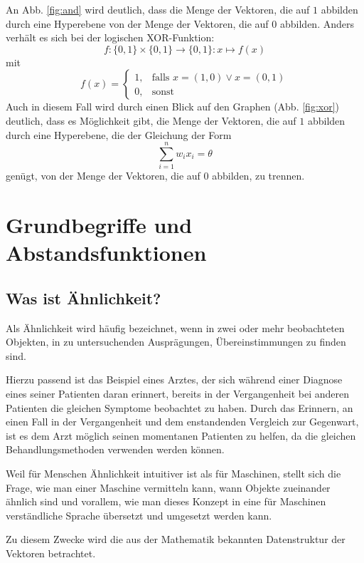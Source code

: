 \documentclass[fontsize=11pt]{scrartcl}
\begin{document}
                    An Abb. \ref{fig:and} wird deutlich, dass die Menge der Vektoren, die auf $1$ abbilden durch eine Hyperebene von der Menge der Vektoren, die auf $0$ abbilden.
                    \newline
                    Anders verhält es sich bei der logischen XOR-Funktion:
                    $$
                        f:\{0,1\}\times\{0,1\}\rightarrow\{0,1\}: x\mapsto f(x)
                    $$
                    mit
                    $$
                        f(x)=\left\{\begin{array}{cl} 1, & \mbox{falls }x=(1,0) \vee x = (0,1)\\
                        0, & \mbox{sonst}\end{array}\right. 
                    $$
                    Auch in diesem Fall wird durch einen Blick auf den Graphen (Abb. \ref{fig:xor}) deutlich, dass es Möglichkeit gibt, die Menge der Vektoren, die auf $1$ abbilden durch eine Hyperebene, die der Gleichung der Form
                    $$
                        \sum_{i=1}^nw_ix_i = \theta
                    $$
                    genügt, von der Menge der Vektoren, die auf $0$ abbilden, zu trennen\cite{ertel2016}.

                        
        \section{Grundbegriffe und Abstandsfunktionen}
            \subsection{Was ist Ähnlichkeit?}
                Als Ähnlichkeit wird häufig bezeichnet, wenn in zwei oder mehr beobachteten Objekten, in zu untersuchenden Ausprägungen, Übereinstimmungen zu finden sind.\par
                Hierzu passend ist das Beispiel eines Arztes, der sich während einer Diagnose eines seiner Patienten daran erinnert, bereits in der Vergangenheit bei anderen Patienten die gleichen Symptome beobachtet zu haben.\cite{ertel2016} Durch das Erinnern, an einen Fall in der Vergangenheit und dem enstandenden Vergleich zur Gegenwart, ist es dem Arzt möglich seinen momentanen Patienten zu helfen, da die gleichen Behandlungsmethoden verwenden werden können.\par
                Weil für Menschen Ähnlichkeit intuitiver ist als für Maschinen, stellt sich die Frage, wie man einer Maschine vermitteln kann, wann Objekte zueinander ähnlich sind und vorallem, wie man dieses Konzept in eine für Maschinen verständliche Sprache übersetzt und umgesetzt werden kann.\par
                Zu diesem Zwecke wird die aus der Mathematik bekannten Datenstruktur der Vektoren betrachtet.
\end{document}
